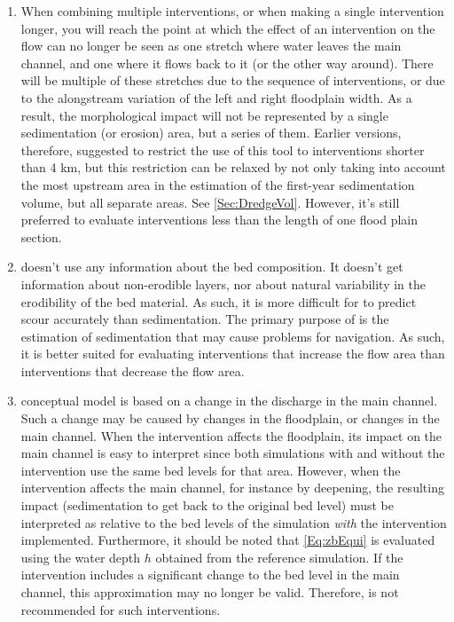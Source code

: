 \begin{enumerate}
\item When combining multiple interventions, or when making a single intervention longer, you will reach the point at which the effect of an intervention on the flow can no longer be seen as one stretch where water leaves the main channel, and one where it flows back to it (or the other way around).
There will be multiple of these stretches due to the sequence of interventions, or due to the alongstream variation of the left and right floodplain width.
As a result, the morphological impact will not be represented by a single sedimentation (or erosion) area, but a series of them.
Earlier versions, therefore, suggested to restrict the use of this tool to interventions shorter than 4 km, but this restriction can be relaxed by not only taking into account the most upstream area in the estimation of the first-year sedimentation volume, but all separate areas.
See \autoref{Sec:DredgeVol}.
However, it's still preferred to evaluate interventions less than the length of one flood plain section.

\item \dfastmi doesn't use any information about the bed composition.
It doesn't get information about non-erodible layers, nor about natural variability in the erodibility of the bed material.
As such, it is more difficult for \dfmi to predict scour accurately than sedimentation.
The primary purpose of \dfmi is the estimation of sedimentation that may cause problems for navigation.
As such, it is better suited for evaluating interventions that increase the flow area than interventions that decrease the flow area.

\item \dfastmi conceptual model is based on a change in the discharge in the main channel.
Such a change may be caused by changes in the floodplain, or changes in the main channel.
When the intervention affects the floodplain, its impact on the main channel is easy to interpret since both simulations with and without the intervention use the same bed levels for that area.
However, when the intervention affects the main channel, for instance by deepening, the resulting impact (sedimentation to get back to the original bed level) must be interpreted as relative to the bed levels of the simulation \emph{with} the intervention implemented.
Furthermore, it should be noted that \autoref{Eq:zbEqui} is evaluated using the water depth $h$ obtained from the reference simulation.
If the intervention includes a significant change to the bed level in the main channel, this approximation may no longer be valid.
Therefore, \dfmi is not recommended for such interventions.


\end{enumerate}
